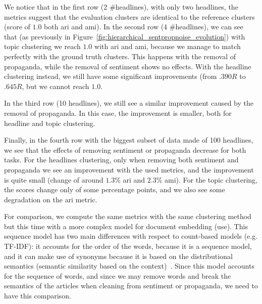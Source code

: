 We notice that in the first row (2 \#headlines), with only two headlines, the metrics suggest that the evaluation clusters are identical to the reference clusters (score of $1.0$ both \acrshort{ari} and \acrshort{ami}).
In the second row (4 \#headlines), we can see that (as previously in Figure~\ref{fig:hierarchical_sentpropnoise_evolution}) with topic clustering we reach $1.0$ with \acrshort{ari} and \acrshort{ami}, because we manage to match perfectly with the ground truth clusters.
This happens with the removal of propaganda, while the removal of sentiment shows no effects.
With the headline clustering instead, we still have some significant improvements (from $.390R$ to $.645R$, but we cannot reach $1.0$.

In the third row (10 headlines), we still see a similar improvement caused by the removal of propaganda. In this case, the improvement is smaller, both for headline and topic clustering.

Finally, in the fourth row with the biggest subset of data made of 100 headlines, we see that the effects of removing sentiment or propaganda decrease for both tasks. For the headlines clustering, only when removing both sentiment and propaganda we see an improvement with the used metrics, and the improvement is quite small (change of around $1.3\%$ \acrshort{ari} and $2.3\%$ \acrshort{ami}). For the topic clustering, the scores change only of some percentage points, and we also see some degradation on the \acrshort{ari} metric.

For comparison, we compute the same metrics with the same clustering method but this time with a more complex model for document embedding (\acrshort{use}). This sequence model has two main differences with respect to count-based models (e.g. TF-IDF): it accounts for the order of the words, because it is a sequence model, and it can make use of synonyms because it is based on the distributional semantics (semantic similarity based on the context)~\citep{firth1957synopsis}. Since this model accounts for the sequence of words, and since we may remove words and break the semantics of the articles when cleaning from sentiment or propaganda, we need to have this comparison.

